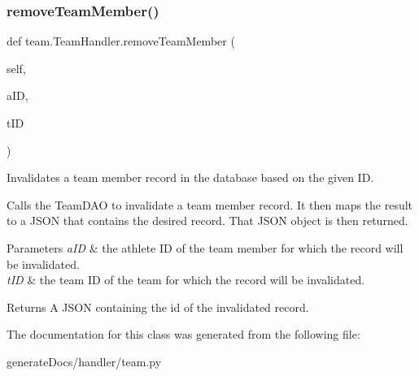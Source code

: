 \subsubsection{\texorpdfstring{remove\+Team\+Member()}{removeTeamMember()}}
{\footnotesize\ttfamily def team.\+Team\+Handler.\+remove\+Team\+Member (\begin{DoxyParamCaption}\item[{}]{self,  }\item[{}]{a\+ID,  }\item[{}]{t\+ID }\end{DoxyParamCaption})}



Invalidates a team member record in the database based on the given ID. 

Calls the Team\+D\+AO to invalidate a team member record. It then maps the result to a J\+S\+ON that contains the desired record. That J\+S\+ON object is then returned.


\begin{DoxyParams}{Parameters}
{\em a\+ID} & the athlete ID of the team member for which the record will be invalidated. \\
\hline
{\em t\+ID} & the team ID of the team for which the record will be invalidated.\\
\hline
\end{DoxyParams}
\begin{DoxyReturn}{Returns}
A J\+S\+ON containing the id of the invalidated record. 
\end{DoxyReturn}


The documentation for this class was generated from the following file\+:\begin{DoxyCompactItemize}
\item 
generate\+Docs/handler/team.\+py\end{DoxyCompactItemize}
